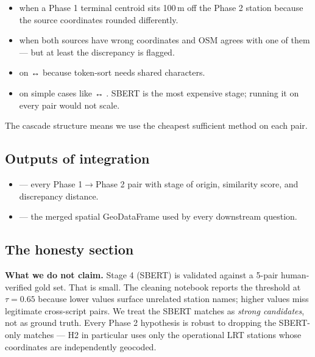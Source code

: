 \begin{itemize}
  \item {} when a Phase 1 terminal centroid sits
        100\,m off the Phase 2 station because the source coordinates
        rounded differently.
  \item {} when both sources have wrong
        coordinates and OSM agrees with one of them — but at least
        the discrepancy is flagged.
  \item {} on  ↔ 
        because token-sort needs shared characters.
  \item {} on simple cases like
         ↔ . SBERT is the most
        expensive stage; running it on every pair would not scale.
\end{itemize}

The cascade structure means we use the cheapest sufficient method on
each pair.

\subsection{Outputs of integration}

\begin{itemize}
  \item {} — every Phase 1$\to$Phase 2
        pair with stage of origin, similarity score, and discrepancy
        distance.
  \item {} — the
        merged spatial GeoDataFrame used by every downstream question.
\end{itemize}

\subsection{The honesty section}

\begin{warningbox}
\textbf{\color{plotorange}What we do not claim.}\quad
Stage 4 (SBERT) is validated against a 5-pair human-verified gold set.
That is small. The cleaning notebook reports the threshold at $\tau=0.65$
because lower values surface unrelated station names; higher values
miss legitimate cross-script pairs. We treat the SBERT matches as
\emph{strong candidates}, not as ground truth. Every Phase 2 hypothesis
is robust to dropping the SBERT-only matches — H2 in particular uses
only the operational LRT stations whose coordinates are independently
geocoded.
\end{warningbox}
